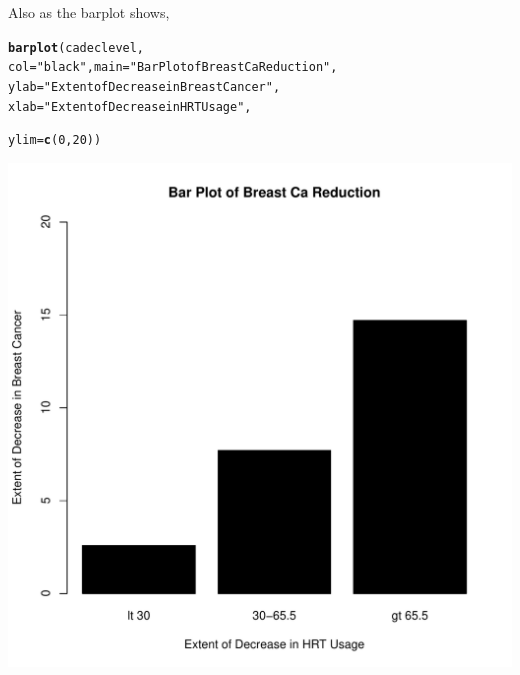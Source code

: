 \documentclass{article}
\makeatletter
\def\maxwidth{ %
  \ifdim\Gin@nat@width>\linewidth
    \linewidth
  \else
    \Gin@nat@width
  \fi
}
\newcommand{\hlnum}[1]{\textcolor[rgb]{0.686,0.059,0.569}{#1}}%
\newcommand{\hlstr}[1]{\textcolor[rgb]{0.192,0.494,0.8}{#1}}%
\newcommand{\hlstd}[1]{\textcolor[rgb]{0.345,0.345,0.345}{#1}}%
\newcommand{\hlkwc}[1]{\textcolor[rgb]{0.333,0.667,0.333}{#1}}%
\newcommand{\hlkwd}[1]{\textcolor[rgb]{0.737,0.353,0.396}{\textbf{#1}}}%
\newenvironment{kframe}{%
 \def\at@end@of@kframe{}%
 \ifinner\ifhmode%
  \def\at@end@of@kframe{\end{minipage}}%
  \begin{minipage}{\columnwidth}%
 \fi\fi%
 \def\FrameCommand##1{\hskip\@totalleftmargin \hskip-\fboxsep
 \colorbox{shadecolor}{##1}\hskip-\fboxsep
     \hskip-\linewidth \hskip-\@totalleftmargin \hskip\columnwidth}%
 \MakeFramed {\advance\hsize-\width
   \@totalleftmargin\z@ \linewidth\hsize
   \@setminipage}}%
 {\par\unskip\endMakeFramed%
 \at@end@of@kframe}
\newenvironment{knitrout}{}{} %
\makeatother
\begin{document}
Also as the barplot shows,
\begin{knitrout}
\color{fgcolor}\begin{kframe}
\begin{alltt}
\hlkwd{barplot}\hlstd{(cadeclevel,}
      \hlkwc{col} \hlstd{=} \hlstr{"black"}\hlstd{,} \hlkwc{main} \hlstd{=} \hlstr{"Bar Plot of Breast Ca Reduction"}\hlstd{,}
     \hlkwc{ylab} \hlstd{=} \hlstr{"Extent of Decrease in Breast Cancer"}\hlstd{,}
        \hlkwc{xlab} \hlstd{=} \hlstr{"Extent of Decrease in HRT Usage"}\hlstd{,}

       \hlkwc{ylim} \hlstd{=} \hlkwd{c}\hlstd{(}\hlnum{0}\hlstd{,} \hlnum{20}\hlstd{))}
\end{alltt}
\end{kframe}
\includegraphics[width=\maxwidth]{figure/barplot2-1} 

\end{knitrout}
\end{document}

